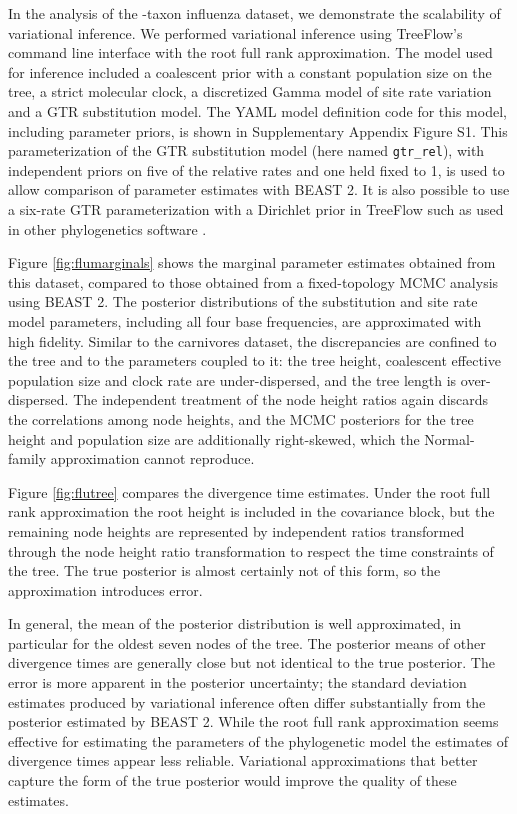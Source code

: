 In the analysis of the -taxon influenza dataset, we demonstrate the scalability of variational inference. We performed variational inference using TreeFlow's command line interface with the root full rank approximation. The model used for inference included a coalescent prior with a constant population size on the tree, a strict molecular clock, a discretized Gamma model of site rate variation and a GTR substitution model. The YAML model definition code for this model, including parameter priors, is shown in Supplementary Appendix Figure S1. This parameterization of the GTR substitution model (here named \texttt{gtr\_rel}), with independent priors on five of the relative rates and one held fixed to 1, is used to allow comparison of parameter estimates with BEAST 2. It is also possible to use a six-rate GTR parameterization with a Dirichlet prior in TreeFlow such as used in other phylogenetics software \cite{huelsenbeck2001mrbayes, hohna2016revbayes}.

Figure \ref{fig:flumarginals} shows the marginal parameter estimates obtained from this dataset, compared to those obtained from a fixed-topology MCMC analysis using BEAST 2. The posterior distributions of the substitution and site rate model parameters, including all four base frequencies, are approximated with high fidelity. Similar to the carnivores dataset, the discrepancies are confined to the tree and to the parameters coupled to it: the tree height, coalescent effective population size and clock rate are under-dispersed, and the tree length is over-dispersed. The independent treatment of the node height ratios again discards the correlations among node heights, and the MCMC posteriors for the tree height and population size are additionally right-skewed, which the Normal-family approximation cannot reproduce.

Figure \ref{fig:flutree} compares the divergence time estimates. Under the root full rank approximation the root height is included in the covariance block, but the remaining node heights are represented by independent ratios transformed through the node height ratio transformation to respect the time constraints of the tree. The true posterior is almost certainly not of this form, so the approximation introduces error.

In general, the mean of the posterior distribution is well approximated, in particular for the oldest seven nodes of the tree. The posterior means of other divergence times are generally close but not identical to the true posterior. The error is more apparent in the posterior uncertainty; the standard deviation estimates produced by variational inference often differ substantially from the posterior estimated by BEAST 2. While the root full rank approximation seems effective for estimating the parameters of the phylogenetic model the estimates of divergence times appear less reliable. Variational approximations that better capture the form of the true posterior would improve the quality of these estimates.

